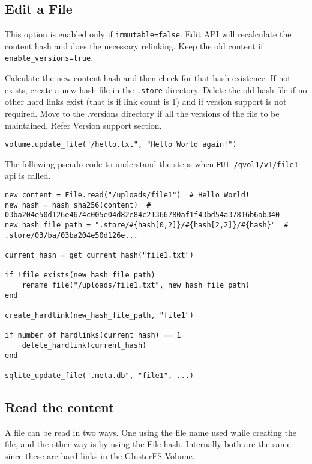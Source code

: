 \documentclass[10pt,a4paper]{article}
\begin{document}
\begin{multicols*}{2}
\subsection{Edit a File}

This option is enabled only if \texttt{immutable=false}. Edit API will recalculate the content hash and does the necessary relinking. Keep the old content if \texttt{enable\_versions=true}.

Calculate the new content hash and then check for that hash existence. If not exists, create a new hash file in the \texttt{.store} directory. Delete the old hash file if no other hard links exist (that is if link count is 1) and if version support is not required. Move to the .versions directory if all the versions of the file to be maintained. Refer Version support section.

\begin{verbatim}
volume.update_file("/hello.txt", "Hello World again!")
\end{verbatim}

The following pseudo-code to understand the steps when \texttt{PUT /gvol1/v1/file1} api is called.

\begin{verbatim}
new_content = File.read("/uploads/file1")  # Hello World!
new_hash = hash_sha256(content)  # 03ba204e50d126e4674c005e04d82e84c21366780af1f43bd54a37816b6ab340
new_hash_file_path = ".store/#{hash[0,2]}/#{hash[2,2]}/#{hash}"  # .store/03/ba/03ba204e50d126e...

current_hash = get_current_hash("file1.txt")

if !file_exists(new_hash_file_path)
    rename_file("/uploads/file1.txt", new_hash_file_path)
end

create_hardlink(new_hash_file_path, "file1")

if number_of_hardlinks(current_hash) == 1
	delete_hardlink(current_hash)
end

sqlite_update_file(".meta.db", "file1", ...)
\end{verbatim}

\subsection{Read the content}

A file can be read in two ways. One using the file name used while creating the file, and the other way is by using the File hash. Internally both are the same since these are hard links in the GlusterFS Volume.


\end{multicols*}
\end{document}
